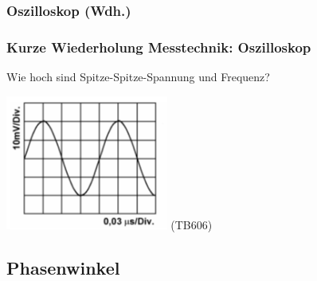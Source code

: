 \subsubsection{Oszilloskop (Wdh.)}

\begin{frame}
  \frametitle{Kurze Wiederholung Messtechnik: Oszilloskop}


  \begin{block}{
    Wie hoch sind Spitze-Spitze-Spannung und Frequenz?
    \begin{center}
      \includegraphics[width=0.4\textwidth]{a11/TB605.png}
      \tiny (TB606)
    \end{center}
    }
  \end{block}

\end{frame}

\subsection{Phasenwinkel}

